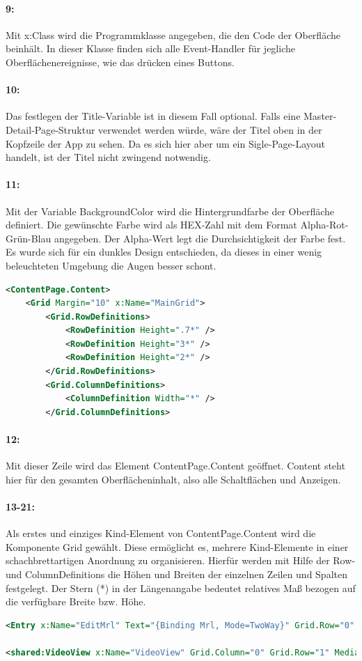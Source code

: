 \paragraph{9:} Mit x:Class wird die Programmklasse angegeben, die den Code der Oberfläche beinhält. In dieser Klasse finden sich alle Event-Handler für jegliche Oberflächenereignisse, wie das drücken eines Buttons.
\paragraph{10:} Das festlegen der Title-Variable ist in diesem Fall optional. Falls eine Master-Detail-Page-Struktur verwendet werden würde, wäre der Titel oben in der Kopfzeile der App zu sehen. Da es sich hier aber um ein Sigle-Page-Layout handelt, ist der Titel nicht zwingend notwendig.
\paragraph{11:} Mit der Variable BackgroundColor wird die Hintergrundfarbe der Oberfläche definiert. Die gewünschte Farbe wird als HEX-Zahl mit dem Format Alpha-Rot-Grün-Blau angegeben. Der Alpha-Wert legt die Durchsichtigkeit der Farbe fest. Es wurde sich für ein dunkles Design entschieden, da dieses in einer wenig beleuchteten Umgebung die Augen besser schont.

\begin{lstlisting}[firstnumber=12,language=xml]
<ContentPage.Content>
    <Grid Margin="10" x:Name="MainGrid">
        <Grid.RowDefinitions>
            <RowDefinition Height=".7*" />
            <RowDefinition Height="3*" />
            <RowDefinition Height="2*" />
        </Grid.RowDefinitions>
        <Grid.ColumnDefinitions>
            <ColumnDefinition Width="*" />
        </Grid.ColumnDefinitions>
\end{lstlisting}
\paragraph{12:} Mit dieser Zeile wird das Element ContentPage.Content geöffnet. Content steht hier für den gesamten Oberflächeninhalt, also alle Schaltflächen und Anzeigen.
\paragraph{13-21:} Als erstes und einziges Kind-Element von ContentPage.Content wird die Komponente Grid gewählt. Diese ermöglicht es, mehrere Kind-Elemente in einer schachbrettartigen Anordnung zu organisieren. Hierfür werden mit Hilfe der Row- und ColumnDefinitions die Höhen und Breiten der einzelnen Zeilen und Spalten festgelegt. Der Stern (*) in der Längenangabe bedeutet relatives Maß bezogen auf die verfügbare Breite bzw. Höhe.
\begin{lstlisting}[firstnumber=23,language=xml]
<Entry x:Name="EditMrl" Text="{Binding Mrl, Mode=TwoWay}" Grid.Row="0" Grid.Column="0" TextColor="White" />

<shared:VideoView x:Name="VideoView" Grid.Column="0" Grid.Row="1" MediaPlayer="{Binding MediaPlayer}"/>
\end{lstlisting}
